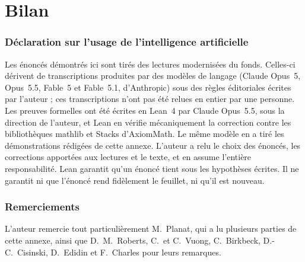\documentclass[11pt]{article}
\newcounter{nonverif}
\theoremstyle{plain}
\theoremstyle{definition}
\theoremstyle{plain}
\theoremstyle{definition}
\theoremstyle{remark}
\renewcommand{\_}{\bkunderscore\allowbreak}
\begin{document}
\part*{Bilan}




\section*{Déclaration sur l'usage de l'intelligence artificielle}

Les énoncés démontrés ici sont tirés des lectures modernisées du fonds. Celles-ci dérivent de transcriptions produites par des modèles de langage (Claude Opus~5, Opus~5.5, Fable~5 et Fable~5.1, d'Anthropic) sous des règles éditoriales écrites par l'auteur ; ces transcriptions n'ont pas été relues en entier par une personne. Les preuves formelles ont été écrites en Lean~4 par Claude Opus~5.5, sous la direction de l'auteur, et Lean en vérifie mécaniquement la correction contre les bibliothèques mathlib et Stacks d'AxiomMath. Le même modèle en a tiré les démonstrations rédigées de cette annexe. L'auteur a relu le choix des énoncés, les corrections apportées aux lectures et le texte, et en assume l'entière responsabilité. Lean garantit qu'un énoncé tient sous les hypothèses écrites. Il ne garantit ni que l'énoncé rend fidèlement le feuillet, ni qu'il est nouveau.


\section*{Remerciements}

L'auteur remercie tout particulièrement M.~Planat, qui a lu plusieurs parties de cette annexe, ainsi que D.~M.~Roberts, C.~et C.~Vuong, C.~Birkbeck, D.-C.~Cisinski, D.~Edidin et F.~Charles pour leurs remarques.
\end{document}
